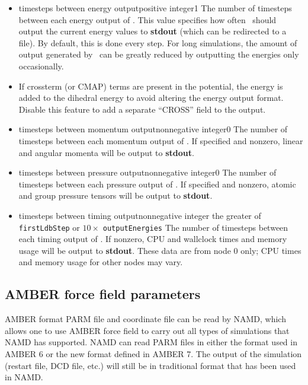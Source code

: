 \begin{itemize}
\item
{}
{timesteps between energy output}{positive integer}{1}
{
The number of timesteps between each energy output of \NAMD.  
This value
specifies how often \NAMD\ should output the current energy 
values to {\bf stdout} (which can be redirected to a file).  
By default, this is done every step.  
For long simulations, 
the amount of output generated by \NAMD\ can be greatly reduced 
by outputting the energies only occasionally.  
}

\item
{}
{
If crossterm (or CMAP) terms are present in the potential,
the energy is added to the dihedral energy to avoid altering
the energy output format.
Disable this feature to add a separate ``CROSS'' field to the output.
}

\item
{}
{timesteps between momentum output}{nonnegative integer}{0}
{
The number of timesteps between each momentum output of \NAMD.
If specified and nonzero, linear and angular momenta will be
output to {\bf stdout}.
}

\item
{}
{timesteps between pressure output}{nonnegative integer}{0}
{
The number of timesteps between each pressure output of \NAMD.
If specified and nonzero, atomic and group pressure tensors
will be output to {\bf stdout}.
}

\item
{}
{timesteps between timing output}{nonnegative integer}
{the greater of {\tt firstLdbStep} or $10 \times$ {\tt outputEnergies}}
{
The number of timesteps between each timing output of \NAMD.
If nonzero, CPU and wallclock times and memory usage will be
output to {\bf stdout}.
These data are from node 0 only; CPU times and memory usage for other nodes
may vary.
}

\end{itemize}


\subsection{AMBER force field parameters}

AMBER format PARM file and coordinate file can be read by NAMD,
which allows one to use AMBER force field to carry out all types
of simulations that NAMD has supported. NAMD can read PARM files
in either the format used in AMBER 6 or the new format
defined in AMBER 7. The output of
the simulation (restart file, DCD file, etc.) will still be in
traditional format that has been used in NAMD.

